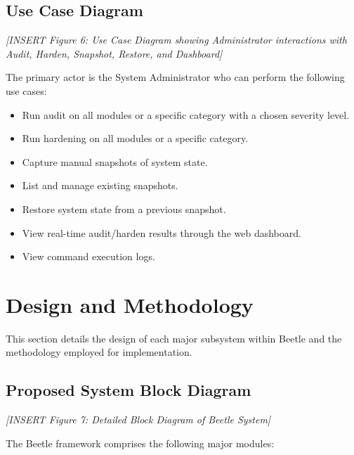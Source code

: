 \subsection{Use Case Diagram}

\vspace{0.5cm}
\noindent\textit{[INSERT Figure 6: Use Case Diagram showing Administrator interactions with Audit, Harden, Snapshot, Restore, and Dashboard]}
\vspace{0.5cm}

The primary actor is the System Administrator who can perform the following use cases:
\begin{itemize}[noitemsep]
    \item Run audit on all modules or a specific category with a chosen severity level.
    \item Run hardening on all modules or a specific category.
    \item Capture manual snapshots of system state.
    \item List and manage existing snapshots.
    \item Restore system state from a previous snapshot.
    \item View real-time audit/harden results through the web dashboard.
    \item View command execution logs.
\end{itemize}

\pagebreak
\section{Design and Methodology}

This section details the design of each major subsystem within Beetle and the methodology employed for implementation.

\subsection{Proposed System Block Diagram}

\vspace{0.5cm}
\noindent\textit{[INSERT Figure 7: Detailed Block Diagram of Beetle System]}
\vspace{0.5cm}

The Beetle framework comprises the following major modules:


